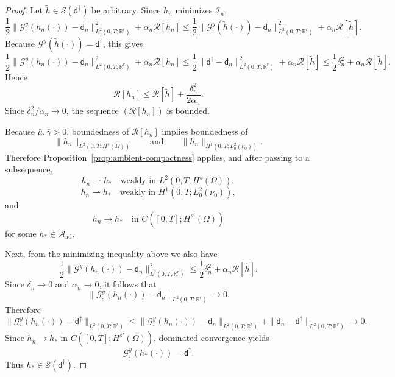 \documentclass{article}
\theoremstyle{definition}
\newcommand{\obsdata}{\mathsf{d}}
\begin{document}
\begin{proof}
    Let \(\tilde h\in \mathcal S(\obsdata^\dagger)\) be arbitrary. Since \(h_n\) minimizes
    \(\mathcal I_n\),
    \[
        \frac12 \|\mathcal G_\cdot^y(h_n(\cdot))-\obsdata_n\|_{L^2(0,T;\mathbb R^r)}^2
        +
        \alpha_n \mathcal R[h_n]
        \le
        \frac12 \|\mathcal G_\cdot^y(\tilde h(\cdot))-\obsdata_n\|_{L^2(0,T;\mathbb R^r)}^2
        +
        \alpha_n \mathcal R[\tilde h].
    \]
    Because \(\mathcal G_\cdot^y(\tilde h(\cdot))=\obsdata^\dagger\), this gives
    \[
        \frac12 \|\mathcal G_\cdot^y(h_n(\cdot))-\obsdata_n\|_{L^2(0,T;\mathbb R^r)}^2
        +
        \alpha_n \mathcal R[h_n]
        \le
        \frac12 \|\obsdata^\dagger-\obsdata_n\|_{L^2(0,T;\mathbb R^r)}^2
        +
        \alpha_n \mathcal R[\tilde h]
        \le
        \frac12 \delta_n^2 + \alpha_n \mathcal R[\tilde h].
    \]
    Hence
    \begin{equation}
        \label{eq:vanishing-regularization-bound}
        \mathcal R[h_n]
        \le
        \mathcal R[\tilde h] + \frac{\delta_n^2}{2\alpha_n}.
    \end{equation}
    Since \(\delta_n^2/\alpha_n \to 0\), the sequence \((\mathcal R[h_n])\) is bounded.

    Because \(\bar\mu,\bar\gamma>0\), boundedness of \(\mathcal R[h_n]\) implies boundedness of
    \[
        \|h_n\|_{L^2(0,T;H^s(\Omega))}
        \qquad\text{and}\qquad
        \|h_n\|_{H^1(0,T;L^2_0(\nu_0))}.
    \]
    Therefore Proposition~\ref{prop:ambient-compactness} applies, and after passing to a subsequence,
    \[
        h_n \rightharpoonup h_\ast
        \quad\text{weakly in } L^2(0,T;H^s(\Omega)),
    \]
    \[
        h_n \rightharpoonup h_\ast
        \quad\text{weakly in } H^1(0,T;L^2_0(\nu_0)),
    \]
    and
    \[
        h_n \to h_\ast
        \quad\text{in } C([0,T];H^{s'}(\Omega))
    \]
    for some \(h_\ast\in \mathcal A_{\mathrm{ad}}\).

    Next, from the minimizing inequality above we also have
    \[
        \frac12 \|\mathcal G_\cdot^y(h_n(\cdot))-\obsdata_n\|_{L^2(0,T;\mathbb R^r)}^2
        \le
        \frac12 \delta_n^2 + \alpha_n \mathcal R[\tilde h].
    \]
    Since \(\delta_n\to 0\) and \(\alpha_n\to 0\), it follows that
    \[
        \|\mathcal G_\cdot^y(h_n(\cdot))-\obsdata_n\|_{L^2(0,T;\mathbb R^r)} \to 0.
    \]
    Therefore
    \[
        \|\mathcal G_\cdot^y(h_n(\cdot))-\obsdata^\dagger\|_{L^2(0,T;\mathbb R^r)}
        \le
        \|\mathcal G_\cdot^y(h_n(\cdot))-\obsdata_n\|_{L^2(0,T;\mathbb R^r)}
        +
        \|\obsdata_n-\obsdata^\dagger\|_{L^2(0,T;\mathbb R^r)}
        \to 0.
    \]
    Since \(h_n\to h_\ast\) in \(C([0,T];H^{s'}(\Omega))\), dominated convergence yields
    \[
        \mathcal G_\cdot^y(h_\ast(\cdot))=\obsdata^\dagger.
    \]
    Thus \(h_\ast\in \mathcal S(\obsdata^\dagger)\).


\end{proof}
\end{document}
